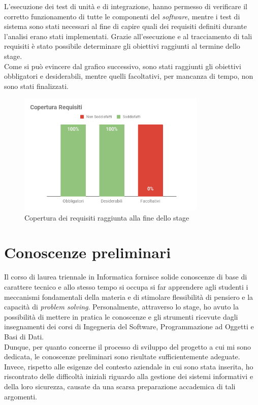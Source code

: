 L'esecuzione dei test di unità e di integrazione, hanno permesso di verificare il corretto funzionamento di tutte le componenti del \emph{software}, mentre i test di sistema
sono stati necessari al fine di capire quali dei requisiti definiti durante l'analisi erano stati implementati.
Grazie all'esecuzione e al tracciamento di tali requisiti
è stato possibile determinare gli obiettivi raggiunti al termine dello stage.
\\
Come si può evincere dal grafico successivo, sono stati raggiunti gli obiettivi obbligatori e desiderabili, mentre quelli facoltativi, per mancanza di tempo, non sono stati finalizzati.
\begin{figure}[H]
\centering
\captionsetup{justification=centering,margin=2cm}
\includegraphics[width=0.8\textwidth ]{figures/copertura.png}
\caption [Grafico copertura dei requisiti raggiunta]{Copertura dei requisiti raggiunta alla fine dello stage \label{fig:coperturarequisiti}}
\end{figure}
\section{Conoscenze preliminari}
Il corso di laurea triennale in Informatica fornisce solide conoscenze di base di carattere tecnico e allo stesso tempo
si occupa si far apprendere agli studenti i meccanismi fondamentali della materia e di stimolare flessibilità di pensiero e la capacità di \emph{problem solving}.
Personalmente, attraverso lo stage, ho avuto la possibilità di mettere in pratica le conoscenze e gli strumenti ricevute dagli insegnamenti dei corsi di Ingegneria del Software, Programmazione ad Oggetti e Basi di Dati. \\
Dunque, per quanto concerne il processo di sviluppo del progetto a cui mi sono dedicata, le conoscenze preliminari sono risultate sufficientemente adeguate. 
Invece, rispetto alle esigenze del contesto aziendale in cui sono stata inserita, ho riscontrato delle difficoltà iniziali riguardo alla gestione dei sistemi informativi e della loro sicurezza, causate da una scarsa preparazione accademica di tali argomenti.
